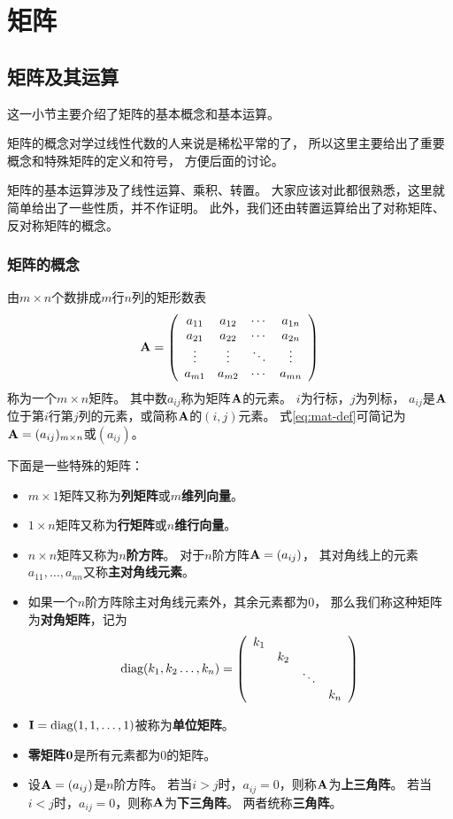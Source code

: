 \chapter{矩阵}

\section{矩阵及其运算}
这一小节主要介绍了矩阵的基本概念和基本运算。

矩阵的概念对学过线性代数的人来说是稀松平常的了，
所以这里主要给出了重要概念和特殊矩阵的定义和符号，
方便后面的讨论。

矩阵的基本运算涉及了线性运算、乘积、转置。
大家应该对此都很熟悉，这里就简单给出了一些性质，并不作证明。
此外，我们还由转置运算给出了对称矩阵、反对称矩阵的概念。

\subsection{矩阵的概念}
\begin{definition}[矩阵]
  由$m\times n$个数排成$m$行$n$列的矩形数表
  \begin{equation} \label{eq:mat-def}
    \mmA = \mmat{cccc}{
      a_{11} & a_{12} & \cdots & a_{1n} \\
      a_{21} & a_{22} & \cdots & a_{2n} \\
      \vdots & \vdots & \ddots & \vdots \\
      a_{m1} & a_{m2} & \cdots & a_{mn} }
  \end{equation}
  称为一个$m\times n$矩阵。
  其中数$a_{ij}$称为矩阵$\mmA$的元素。
  $i$为行标，$j$为列标，
  $a_{ij}$是$\mmA$位于第$i$行第$j$列的元素，或简称$\mmA$的$(i,j)$元素。
  式\eqref{eq:mat-def}可简记为$\mmA=(a_{ij})_{m\times n}$或$(a_{ij})$。
\end{definition}

下面是一些特殊的矩阵：
\begin{itemize}
  \item
  $m\times 1$矩阵又称为\textbf{列矩阵}或$m$\textbf{维列向量}。
  \item
  $1\times n$矩阵又称为\textbf{行矩阵}或$n$\textbf{维行向量}。
  \item
  $n\times n$矩阵又称为$n$\textbf{阶方阵}。
  对于$n$阶方阵$\mmA=(a_{ij})$，
  其对角线上的元素$a_{11},\dots,a_{nn}$又称\textbf{主对角线元素}。
  \item
  如果一个$n$阶方阵除主对角线元素外，其余元素都为0，
  那么我们称这种矩阵为\textbf{对角矩阵}，记为
  \[
    \mdiag(k_1, k_2\dots,k_n)= \mmat{cccc}{
      k_1 &     &        & \\
          & k_2 &        & \\
          &     & \ddots & \\
          &     &        & k_n }
  \]
  \item
  $\mmI = \mdiag(1,1,\dots,1)$被称为\textbf{单位矩阵}。
  \item
  \textbf{零矩阵}$\mmZero$是所有元素都为0的矩阵。
  \item
  设$\mmA=(a_{ij})$是$n$阶方阵。
  若当$i>j$时，$a_{ij}=0$，则称$\mmA$为\textbf{上三角阵}。
  若当$i<j$时，$a_{ij}=0$，则称$\mmA$为\textbf{下三角阵}。
  两者统称\textbf{三角阵}。
\end{itemize}

